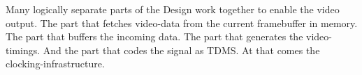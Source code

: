 \documentclass[../main/report.tex]{subfiles}
\begin{document}
Many logically separate parts of the Design work together to enable the video output.
The part that fetches video-data from the current framebuffer in memory.
The part that buffers the incoming data.
The part that generates the video-timings.
And the part that codes the signal as TDMS.
At that comes the clocking-infrastructure.
\end{document}

